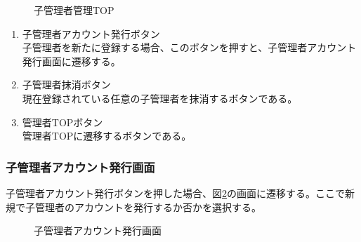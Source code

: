 \documentclass[a4j]{jarticle}
\begin{document}
\begin{figure}[H]
\centering
{}
\caption{子管理者管理TOP}
\label{fig:admin_child_top}
\end{figure}
\begin{enumerate}
  \renewcommand{\labelenumi}{\textcircled{\scriptsize \theenumi}}

  \item 子管理者アカウント発行ボタン\\
  子管理者を新たに登録する場合、このボタンを押すと、子管理者アカウント発行画面に遷移する。
  \item 子管理者抹消ボタン\\
  現在登録されている任意の子管理者を抹消するボタンである。
  \item 管理者TOPボタン\\
  管理者TOPに遷移するボタンである。

\end{enumerate}

\subsubsection{子管理者アカウント発行画面}
子管理者アカウント発行ボタンを押した場合、図\ref{fig:create_admin}の画面に遷移する。ここで新規で子管理者のアカウントを発行するか否かを選択する。
\begin{figure}[H]
\centering
{}
\caption{子管理者アカウント発行画面}
\label{fig:create_admin}
\end{figure}
\end{document}
